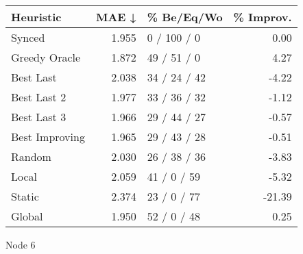 \begin{tabular}{lrlr}
\toprule
\textbf{Heuristic} & \textbf{MAE ↓} & \textbf{\% Be/Eq/Wo} & \textbf{\% Improv.} \\
\midrule
            Synced &          1.955 &          0 / 100 / 0 &                0.00 \\
     Greedy Oracle &          1.872 &          49 / 51 / 0 &                4.27 \\
         Best Last &          2.038 &         34 / 24 / 42 &               -4.22 \\
       Best Last 2 &          1.977 &         33 / 36 / 32 &               -1.12 \\
       Best Last 3 &          1.966 &         29 / 44 / 27 &               -0.57 \\
    Best Improving &          1.965 &         29 / 43 / 28 &               -0.51 \\
            Random &          2.030 &         26 / 38 / 36 &               -3.83 \\
             Local &          2.059 &          41 / 0 / 59 &               -5.32 \\
            Static &          2.374 &          23 / 0 / 77 &              -21.39 \\
            Global &          1.950 &          52 / 0 / 48 &                0.25 \\
\bottomrule
\end{tabular}
\caption{Node 6}
\label{tab:hr_non_lr05_le2_bs2_6}
